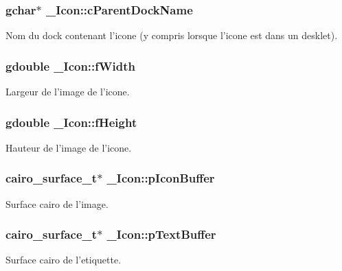 \subsubsection{\setlength{\rightskip}{0pt plus 5cm}gchar$\ast$ {\bf \_\-Icon::cParentDockName}}\label{struct__Icon_3a79d44f8a7ff21cb0d73f5570a35266}


Nom du dock contenant l'icone (y compris lorsque l'icone est dans un desklet). 

\subsubsection{\setlength{\rightskip}{0pt plus 5cm}gdouble {\bf \_\-Icon::fWidth}}\label{struct__Icon_1601cdc5344f5ee7e399c6b1a65feb50}


Largeur de l'image de l'icone. 

\subsubsection{\setlength{\rightskip}{0pt plus 5cm}gdouble {\bf \_\-Icon::fHeight}}\label{struct__Icon_5849393004f8412ac1468827b7e810f3}


Hauteur de l'image de l'icone. 

\subsubsection{\setlength{\rightskip}{0pt plus 5cm}cairo\_\-surface\_\-t$\ast$ {\bf \_\-Icon::pIconBuffer}}\label{struct__Icon_eabd5f48e2453ec0eb2f7bb223a9873b}


Surface cairo de l'image. 

\subsubsection{\setlength{\rightskip}{0pt plus 5cm}cairo\_\-surface\_\-t$\ast$ {\bf \_\-Icon::pTextBuffer}}\label{struct__Icon_750cbf0bef73d6170c261cb7fd0b52d7}


Surface cairo de l'etiquette. 

